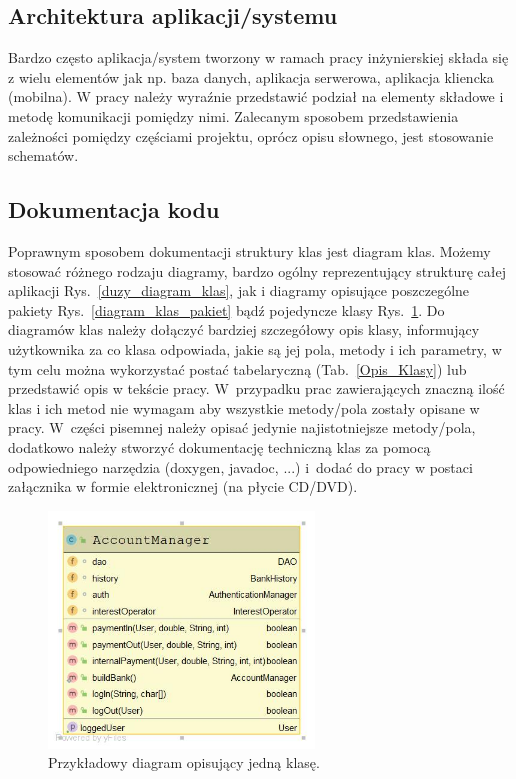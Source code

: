 \documentclass[12pt,a4paper]{article}
\begin{document}
\subsection{Architektura aplikacji/systemu}
Bardzo często aplikacja/system tworzony w ramach pracy inżynierskiej składa się z wielu elementów jak np. baza danych, aplikacja serwerowa, aplikacja kliencka (mobilna). W pracy należy wyraźnie przedstawić podział na elementy składowe i metodę komunikacji pomiędzy nimi. Zalecanym sposobem przedstawienia zależności pomiędzy częściami projektu, oprócz opisu słownego, jest stosowanie schematów.

\subsection{Dokumentacja kodu}
 Poprawnym sposobem dokumentacji struktury klas jest diagram klas. Możemy stosować różnego rodzaju diagramy, bardzo ogólny reprezentujący strukturę całej aplikacji Rys.~\ref{duzy_diagram_klas}, jak i diagramy opisujące poszczególne pakiety Rys.~\ref{diagram_klas_pakiet} bądź pojedyncze klasy Rys.~\ref{diagram_wybranej_klasy}. Do diagramów klas należy dołączyć bardziej szczegółowy opis klasy, informujący użytkownika za co klasa odpowiada, jakie są jej pola, metody i ich parametry, w tym celu można wykorzystać postać tabelaryczną (Tab.~\ref{Opis_Klasy}) lub przedstawić opis w tekście pracy. W~przypadku prac zawierających znaczną ilość klas i ich metod nie wymagam aby wszystkie metody/pola zostały opisane w pracy. W~części  pisemnej należy opisać jedynie najistotniejsze metody/pola, dodatkowo należy stworzyć dokumentację techniczną klas za pomocą odpowiedniego narzędzia (doxygen, javadoc, ...) i~dodać do pracy w postaci załącznika w formie elektronicznej (na płycie CD/DVD).

\begin{figure}[!h]
\centering
\includegraphics[width = 200pt]{DiagramKlasy.jpg}
\caption{Przykładowy diagram opisujący jedną klasę.}\label{diagram_wybranej_klasy}
\end{figure}
\end{document}
